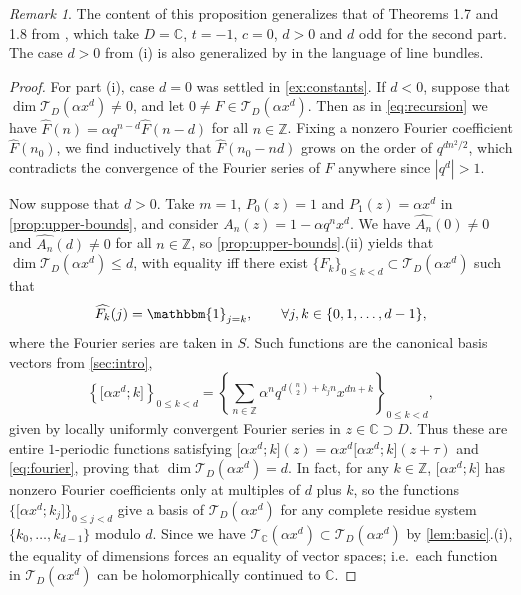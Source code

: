 \documentclass[reqno,11pt]{amsart}
\theoremstyle{definition}
\theoremstyle{remark}
\newtheorem*{remark}{Remark}
\numberwithin{equation}{section}
\newcommand{\Z}{\mathbb{Z}}
\newcommand{\C}{\mathbb{C}}
\newcommand{\mT}{\mathcal{T}}
\newcommand{\one}{\mathbbm{1}}
\newcommand{\vect}[2]{\big[{#1};{#2}\big]}
\renewcommand{\hat}{\widehat}
\begin{document}
\begin{remark}
The content of this proposition generalizes that of Theorems 1.7 and 1.8 from \cite{hickerson1988proof}, which take $D = \C$, $t = -1$, $c = 0$, $d > 0$ and $d$ odd for the second part. The case $d > 0$ from (i) is also generalized by \cite[Theorem 3.5]{beauville2013theta} in the language of line bundles.
\end{remark}

\begin{proof}
For part (i), case $d = 0$ was settled in \cref{ex:constants}. If $d < 0$, suppose that $\dim \mT_D\left(\alpha x^{d}\right) \neq 0$, and let $0 \neq F \in \mT_D\left(\alpha x^{d}\right)$. Then as in \cref{eq:recursion} we have $\hat{F}(n) = \alpha q^{n-d} \hat{F}(n-d)$ for all $n \in \Z$. Fixing a nonzero Fourier coefficient $\hat{F}(n_0)$, we find inductively that $\hat{F}(n_0 - nd)$ grows on the order of $q^{dn^2/2}$, which contradicts the convergence of the Fourier series of $F$ anywhere since $\left\vert q^d\right\vert > 1$.

Now suppose that $d > 0$. Take $m = 1$, $P_0(z) = 1$ and $P_1(z) = \alpha x^d$ in \cref{prop:upper-bounds}, and consider $A_n(z) = 1 - \alpha q^n x^d$. We have $\hat{A_n}(0) \neq 0$ and $\hat{A_n}(d) \neq 0$ for all $n \in \Z$, so \cref{prop:upper-bounds}.(ii) yields that $\dim \mT_D\left(\alpha x^d \right) \le d$, with equality iff there exist $\{F_k\}_{0 \le k < d} \subset \mT_D\left(\alpha x^d \right)$ such that 
\begin{equation} \label{eq:fourier}
    \hat{F_k}(j) = \one_{j=k}, \qquad \forall j, k \in \{0, 1, \ldots, d-1\},
\end{equation}
where the Fourier series are taken in $S$. Such functions are the canonical basis vectors from \cref{sec:intro},
\[
    \left\{\vect{\alpha x^d}{k}\right\}_{0 \le k < d}
    =
    \left\{\sum_{n \in \Z} \alpha^n q^{d\binom{n}{2}+k_jn}x^{dn+k}\right\}_{0 \le k < d},
\]
given by locally uniformly convergent Fourier series in $z \in \C \supset D$. Thus these are entire $1$-periodic functions satisfying $\vect{\alpha x^d}{k}(z) = \alpha x^d \vect{\alpha x^d}{k}(z+\tau)$ and \cref{eq:fourier}, proving that $\dim \mT_D\left(\alpha x^d\right) = d$. In fact, for any $k \in \Z$, $\vect{\alpha x^d}{k}$ has nonzero Fourier coefficients only at multiples of $d$ plus $k$, so the functions $\{\vect{\alpha x^d}{k_j}\}_{0 \le j < d}$ give a basis of $\mT_D\left(\alpha x^d\right)$ for any complete residue system $\{k_0, \ldots, k_{d-1}\}$ modulo $d$. Since we have $\mT_\C\left(\alpha x^d\right) \subset \mT_D\left(\alpha x^d \right)$ by \cref{lem:basic}.(i), the equality of dimensions forces an equality of vector spaces; i.e.\ each function in $\mT_D\left(\alpha x^d \right)$ can be holomorphically continued to $\C$.


\end{proof}
\end{document}
